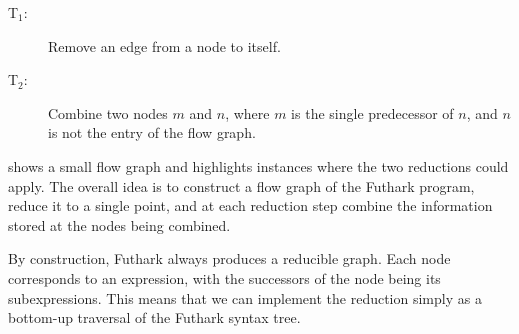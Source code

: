 \begin{description}
  \item[T$_{1}$:] Remove an edge from a node to itself.

  \item[T$_{2}$:] Combine two nodes $m$ and $n$, where $m$ is the
    single predecessor of $n$, and $n$ is not the entry of the flow
    graph.
\end{description}

 shows a small flow graph and highlights instances
where the two reductions could apply.  The overall idea is to
construct a flow graph of the Futhark program, reduce it to a single
point, and at each reduction step combine the information stored at
the nodes being combined.

By construction, Futhark always produces a reducible graph.  Each node
corresponds to an expression, with the successors of the node being
its subexpressions.  This means that we can implement the reduction
simply as a bottom-up traversal of the Futhark syntax tree.

